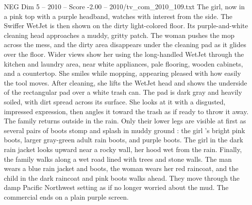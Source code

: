 \begin{textsample}{NEG Dim 5 – 2010 – Score -2.00 – 2010/tv\_com\_2010\_109.txt}
The girl, now in a pink top with a purple headband, watches with interest from the side.
The Swiffer WetJet is then shown on the dirty light-colored floor.
Its purple-and-white cleaning head approaches a muddy, gritty patch.
The woman pushes the mop across the mess, and the dirty area disappears under the cleaning pad as it glides over the floor.
Wider views show her using the long-handled WetJet through the kitchen and laundry area, near white appliances, pale flooring, wooden cabinets, and a countertop.
She smiles while mopping, appearing pleased with how easily the tool moves.
After cleaning, she lifts the WetJet head and shows the underside of the rectangular pad over a white trash can.
The pad is dark gray and heavily soiled, with dirt spread across its surface.
She looks at it with a disgusted, impressed expression, then angles it toward the trash as if ready to throw it away.
The family returns outside in the rain.
Only their lower legs are visible at first as several pairs of boots stomp and splash in muddy ground : the girl ’s bright pink boots, larger gray-green adult rain boots, and purple boots.
The girl in the dark rain jacket looks upward near a rocky wall, her hood wet from the rain.
Finally, the family walks along a wet road lined with trees and stone walls.
The man wears a blue rain jacket and boots, the woman wears her red raincoat, and the child in the dark raincoat and pink boots walks ahead.
They move through the damp Pacific Northwest setting as if no longer worried about the mud.
The commercial ends on a plain purple screen.

\end{textsample}
